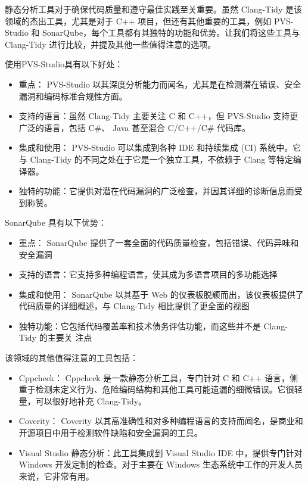 
静态分析工具对于确保代码质量和遵守最佳实践至关重要。虽然 Clang-Tidy 是该领域的杰出工具，尤其是对于 C++ 项目，但还有其他重要的工具，例如 PVS-Studio 和 SonarQube，每个工具都有其独特的功能和优势。让我们将这些工具与 Clang-Tidy 进行比较，并提及其他一些值得注意的选项。


使用PVS-Studio具有以下好处：

\begin{itemize}
\item
重点： PVS-Studio 以其深度分析能力而闻名，尤其是在检测潜在错误、安全漏洞和编码标准合规性方面。

\item
支持的语言：虽然 Clang-Tidy 主要关注 C 和 C++，但 PVS-Studio 支持更广泛的语言，包括 C\#、 Java 甚至混合 C/C++/C\# 代码库。

\item
集成和使用： PVS-Studio 可以集成到各种 IDE 和持续集成 (CI) 系统中。它与 Clang-Tidy 的不同之处在于它是一个独立工具，不依赖于 Clang 等特定编译器。

\item
独特的功能：它提供对潜在代码漏洞的广泛检查，并因其详细的诊断信息而受到称赞。
\end{itemize}


SonarQube 具有以下优势：

\begin{itemize}
\item
重点： SonarQube 提供了一套全面的代码质量检查，包括错误、代码异味和安全漏洞

\item
支持的语言：它支持多种编程语言，使其成为多语言项目的多功能选择

\item
集成和使用： SonarQube 以其基于 Web 的仪表板脱颖而出，该仪表板提供了代码质量的详细概述，与 Clang-Tidy 相比提供了更全面的视图

\item
独特功能：它包括代码覆盖率和技术债务评估功能，而这些并不是 Clang-Tidy 的主要关
注点
\end{itemize}


该领域的其他值得注意的工具包括：

\begin{itemize}
\item
Cppcheck： Cppcheck 是一款静态分析工具，专门针对 C 和 C++ 语言，侧重于检测未定义行为、危险编码结构和其他工具可能遗漏的细微错误。它很轻量，可以很好地补充 Clang-Tidy。

\item
Coverity： Coverity 以其高准确性和对多种编程语言的支持而闻名，是商业和开源项目中用于检测软件缺陷和安全漏洞的工具。

\item
Visual Studio 静态分析：此工具集成到 Visual Studio IDE 中，提供专门针对 Windows 开发定制的检查。对于主要在 Windows 生态系统中工作的开发人员来说，它非常有用。
\end{itemize}

